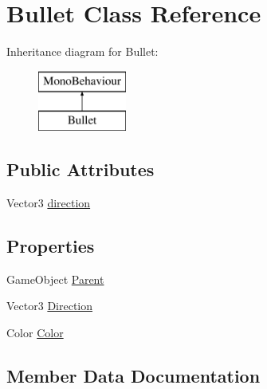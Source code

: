 \hypertarget{class_bullet}{}\section{Bullet Class Reference}
\label{class_bullet}
Inheritance diagram for Bullet\+:\begin{figure}[H]
\begin{center}
\leavevmode
\includegraphics[height=2.000000cm]{class_bullet}
\end{center}
\end{figure}
\subsection*{Public Attributes}
\begin{DoxyCompactItemize}
\item 
Vector3 \mbox{\hyperlink{class_bullet_a3e2c779af8ba4b97394b3ae4be1404b5}{direction}}
\end{DoxyCompactItemize}
\subsection*{Properties}
\begin{DoxyCompactItemize}
\item 
Game\+Object \mbox{\hyperlink{class_bullet_ac42f67adee20458b6c1d1e3a50c37324}{Parent}}
\item 
Vector3 \mbox{\hyperlink{class_bullet_a5c72494550e4c1b0afc815a3a10679d9}{Direction}}
\item 
Color \mbox{\hyperlink{class_bullet_a11c93a49641814a887a9275cf5f927b2}{Color}}
\end{DoxyCompactItemize}


\subsection{Member Data Documentation}
\mbox{\label{class_bullet_a3e2c779af8ba4b97394b3ae4be1404b5}} 
